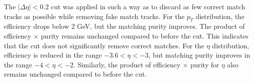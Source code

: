            The \( |\Delta \eta| < 0.2 \) cut was applied in such a way as to discard as few correct match tracks as possible while removing fake match tracks. For the \( p_T \) distribution, the efficiency drops below 2 GeV, but the matching purity improves. The product of efficiency \(\times\) purity remains unchanged compared to before the cut. This indicates that the cut does not significantly remove correct matches. For the \(\eta\) distribution, efficiency is reduced in the range \( -3.6 < \eta < -3 \), but matching purity improves in the range \( -4 < \eta < -2 \). Similarly, the product of efficiency \(\times\) purity for \(\eta\) also remains unchanged compared to before the cut.